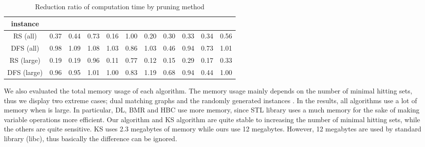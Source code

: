 \begin{table}
\caption{Reduction ratio of computation time by pruning method}
\label{pru}
\begin{center}
\begin{tabular}[c]{| r | r | r | r | r | r | r | r | r | r | r |} 
\hline
\multicolumn{1}{|c||}{instance}  & \multicolumn{1}{|c|}{} & \multicolumn{1}{|c|}{} & \multicolumn{1}{|c|}{} & \multicolumn{1}{|c|}{} & \multicolumn{1}{|c|}{} & \multicolumn{1}{|c|}{} & \multicolumn{1}{|c|}{} & \multicolumn{1}{|c|}{} & \multicolumn{1}{|c|}{} & \multicolumn{1}{|c|}{}\\\hline
 \multicolumn{1}{|c||}{RS (all)}  & 0.37 & 0.44 & 0.73 & 0.16 & 1.00 & 0.20 & 0.30 & 0.33 & 0.34 & 0.56\\\hline
 \multicolumn{1}{|c||}{DFS (all)}  & 0.98 & 1.09 & 1.08 & 1.03 & 0.86 & 1.03 & 0.46 & 0.94 & 0.73 & 1.01\\\hline
 \multicolumn{1}{|c||}{RS (large)}  & 0.19  & 0.19  & 0.96  & 0.11  & 0.77  & 0.12  & 0.15  & 0.29  & 0.17  & 0.33\\\hline
 \multicolumn{1}{|c||}{DFS (large)}  &0.96  & 0.95  & 1.01  & 1.00  & 0.83  & 1.19  & 0.68  & 0.94  & 0.44  & 1.00 \\\hline
\end{tabular}
\end{center}
\end{table}

We also evaluated the total memory usage of each algorithm.
The memory usage mainly depends on the number of minimal hitting sets,
 thus we display two extreme cases; dual matching graphs  and the
 randomly generated instances .
In the results, all algorithms use a lot of memory when  is large.
In particular, DL, BMR and HBC use more memory, since STL library uses a
 much memory for the sake of making variable operations more efficient.
Our algorithm and KS algorithm are quite stable to increasing the number
 of minimal hitting sets, while the others are quite sensitive.
KS uses 2.3 megabytes of memory while ours use 12 megabytes.
However, 12 megabytes are used by standard library (libc),
 thus basically the difference can be ignored.

